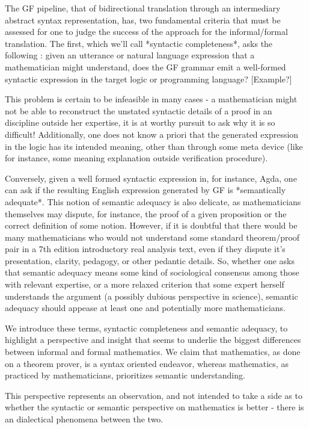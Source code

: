 The GF pipeline, that of bidirectional translation through an intermediary
abstract syntax representation, has, two fundamental criteria that must be
assessed for one to judge the success of the approach for the informal/formal
translation. The first, which we'll call *syntactic completeness*, asks the
following : given an utterance or natural language expression that a
mathematician might understand, does the GF grammar emit a well-formed syntactic
expression in the target logic or programming language? [Example?]

This problem is certain to be infeasible in many cases - a mathematician might
not be able to reconstruct the unstated syntactic details of a proof in an
discipline outside her expertise, it is at worthy pursuit to ask why it is so
difficult! Additionally, one does not know a priori that the generated
expression in the logic has its intended meaning, other than through some meta
device (like for instance, some meaning explanation outside verification
procedure).

Conversely, given a well formed syntactic expression in, for instance, Agda, one
can ask if the resulting English expression generated by GF is *semantically
adequate*. This notion of semantic adequacy is also delicate, as mathematicians
themselves may dispute, for instance, the proof of a given proposition or the
correct definition of some notion. However, if it is doubtful that there would
be many mathematicians who would not understand some standard theorem/proof pair
in a 7th edition introductory real analysis text, even if they dispute it's
presentation, clarity, pedagogy, or other pedantic details. So, whether one asks
that semantic adequacy means some kind of sociological consensus among those
with relevant expertise, or a more relaxed criterion that some expert herself
understands the argument (a possibly dubious perspective in science), semantic
adequacy should appease at least one and potentially more mathematicians.

We introduce these terms, syntactic completeness and semantic adequacy, to
highlight a perspective and insight that seems to underlie the biggest
differences between informal and formal mathematics. We claim that mathematics,
as done on a theorem prover, is a syntax oriented endeavor, whereas mathematics,
as practiced by mathematicians, prioritizes semantic understanding.

This perspective represents an observation, and not intended to take a side as
to whether the syntactic or semantic perspective on mathematics is better -
there is an dialectical phenomena between the two.

